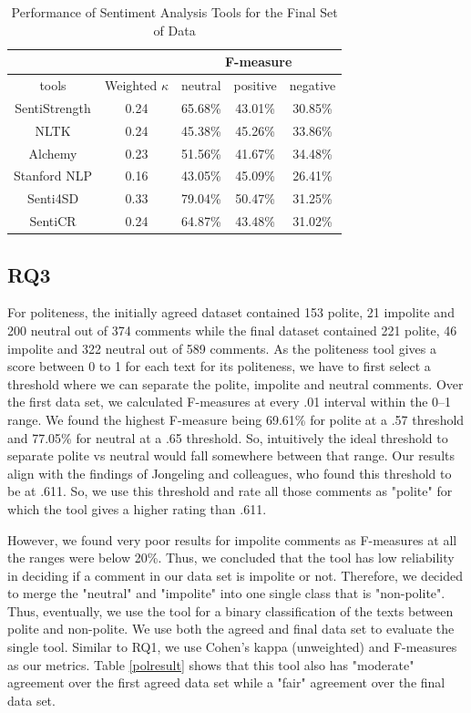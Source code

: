 \begin{table}
\centering
\caption{Performance of Sentiment Analysis Tools for the Final Set of Data}
\label{sentfinal}
\begin{tabular}{|c|c|c|c|c|}
\hline
\multicolumn{2}{|c|}{ } & \multicolumn{3}{c|}{ F-measure } \\
\hline
tools & Weighted $\kappa$ & neutral & positive & negative \\
\hline
SentiStrength & 0.24 & 65.68\% & 43.01\% & 30.85\% \\
\hline
NLTK & 0.24 & 45.38\% & 45.26\% & 33.86\% \\
\hline
Alchemy & 0.23 & 51.56\% & 41.67\% & 34.48\% \\
\hline
Stanford NLP & 0.16 & 43.05\% & 45.09\% & 26.41\% \\
\hline
Senti4SD & 0.33 & 79.04\% & 50.47\% &  31.25\% \\
\hline
SentiCR & 0.24 & 64.87\% & 43.48\% & 31.02\% \\
\hline
\end{tabular}
\end{table}

\subsection{RQ3}

For politeness, 
the initially agreed dataset contained 
153 polite, 21 impolite and 200 neutral 
out of 374 comments 
while the final dataset contained 
221 polite, 46 impolite and 322 neutral 
out of 589 comments. 
As the politeness tool
gives a score between 0 to 1 
for each text for its politeness, 
we have to first select a threshold 
where we can separate the polite, impolite and neutral comments. 
Over the first data set, we calculated F-measures 
at every .01 interval within the 0--1 range. 
We found the highest F-measure 
being 69.61\%  for polite at a .57 threshold 
and 77.05\% for neutral at a .65 threshold. 
So, intuitively the ideal threshold 
to separate polite vs neutral 
would fall somewhere between that range. 
Our results align with the findings of Jongeling and colleagues,
who found this threshold to be at .611. 
So, we use this threshold and 
rate all those comments as "polite" 
for which the tool gives a higher rating than .611.

However, we found 
very poor results
for impolite comments 
as F-measures at all the ranges were below 20\%. 
Thus, we concluded that 
the tool has low reliability 
in deciding if a comment in our data set is impolite or not. 
Therefore, we decided to merge the "neutral" and "impolite"
into one single class that is "non-polite". 
Thus, eventually, we use the tool 
for a binary classification of the texts 
between polite and non-polite.
We use both the agreed and final data set
to evaluate the single tool. 
Similar to RQ1, 
we use Cohen's kappa (unweighted) and F-measures as our metrics. Table \ref{polresult} shows that this tool also 
has "moderate" agreement over the first agreed data set 
while a "fair" agreement over the final data set. 

